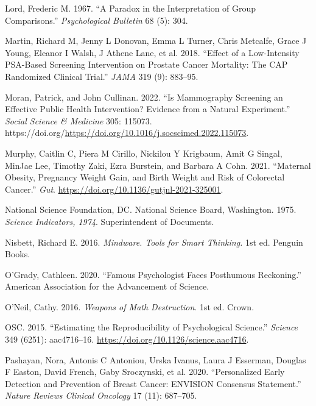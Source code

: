 \documentclass[
  10pt,
  b5paper]{book}
\newlength{\cslhangindent}
\newlength{\cslentryspacingunit} %
\newenvironment{CSLReferences}[2] %
 {%
  \setlength{\parindent}{0pt}
  \ifodd #1
  \let\oldpar\par
  \def\par{\hangindent=\cslhangindent\oldpar}
  \fi
  \setlength{\parskip}{#2\cslentryspacingunit}
 }%
 {}
\begin{document}
\begin{CSLReferences}{1}{0}
\leavevmode{}%
Lord, Frederic M. 1967. {``A Paradox in the Interpretation of Group Comparisons.''} \emph{Psychological Bulletin} 68 (5): 304.

\leavevmode{}%
Martin, Richard M, Jenny L Donovan, Emma L Turner, Chris Metcalfe, Grace J Young, Eleanor I Walsh, J Athene Lane, et al. 2018. {``Effect of a Low-Intensity PSA-Based Screening Intervention on Prostate Cancer Mortality: The CAP Randomized Clinical Trial.''} \emph{JAMA} 319 (9): 883--95.

\leavevmode{}%
Moran, Patrick, and John Cullinan. 2022. {``Is Mammography Screening an Effective Public Health Intervention? Evidence from a Natural Experiment.''} \emph{Social Science \& Medicine} 305: 115073. https://doi.org/\url{https://doi.org/10.1016/j.socscimed.2022.115073}.

\leavevmode{}%
Murphy, Caitlin C, Piera M Cirillo, Nickilou Y Krigbaum, Amit G Singal, MinJae Lee, Timothy Zaki, Ezra Burstein, and Barbara A Cohn. 2021. {``Maternal Obesity, Pregnancy Weight Gain, and Birth Weight and Risk of Colorectal Cancer.''} \emph{Gut}. \url{https://doi.org/10.1136/gutjnl-2021-325001}.

\leavevmode{}%
National Science Foundation, DC. National Science Board, Washington. 1975. \emph{Science Indicators, 1974}. Superintendent of Documents.

\leavevmode{}%
Nisbett, Richard E. 2016. \emph{Mindware. Tools for Smart Thinking.} 1st ed. Penguin Books.

\leavevmode{}%
O'Grady, Cathleen. 2020. {``Famous Psychologist Faces Posthumous Reckoning.''} American Association for the Advancement of Science.

\leavevmode{}%
O'Neil, Cathy. 2016. \emph{Weapons of Math Destruction}. 1st ed. Crown.

\leavevmode{}%
OSC. 2015. {``Estimating the Reproducibility of Psychological Science.''} \emph{Science} 349 (6251): aac4716--16. \url{https://doi.org/10.1126/science.aac4716}.

\leavevmode{}%
Pashayan, Nora, Antonis C Antoniou, Urska Ivanus, Laura J Esserman, Douglas F Easton, David French, Gaby Sroczynski, et al. 2020. {``Personalized Early Detection and Prevention of Breast Cancer: ENVISION Consensus Statement.''} \emph{Nature Reviews Clinical Oncology} 17 (11): 687--705.


\end{CSLReferences}
\end{document}
